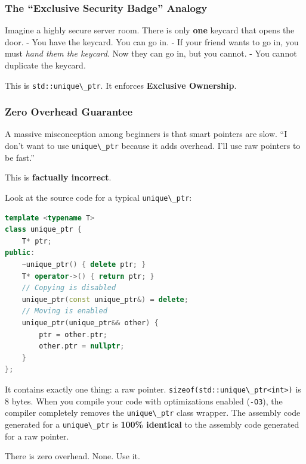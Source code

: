 \hypertarget{the-exclusive-security-badge-analogy}{%
\subsubsection{The ``Exclusive Security Badge''
Analogy}\label{the-exclusive-security-badge-analogy}}

Imagine a highly secure server room. There is only \textbf{one} keycard
that opens the door. - You have the keycard. You can go in. - If your
friend wants to go in, you must \emph{hand them the keycard}. Now they
can go in, but you cannot. - You cannot duplicate the keycard.

This is \passthrough{\lstinline!std::unique\_ptr!}. It enforces
\textbf{Exclusive Ownership}.

\hypertarget{zero-overhead-guarantee}{%
\subsubsection{Zero Overhead Guarantee}\label{zero-overhead-guarantee}}

A massive misconception among beginners is that smart pointers are slow.
``I don't want to use \passthrough{\lstinline!unique\_ptr!} because it
adds overhead. I'll use raw pointers to be fast.''

This is \textbf{factually incorrect}.

Look at the source code for a typical
\passthrough{\lstinline!unique\_ptr!}:

\begin{lstlisting}[language={C++}]
template <typename T>
class unique_ptr {
    T* ptr;
public:
    ~unique_ptr() { delete ptr; }
    T* operator->() { return ptr; }
    // Copying is disabled
    unique_ptr(const unique_ptr&) = delete; 
    // Moving is enabled
    unique_ptr(unique_ptr&& other) {
        ptr = other.ptr;
        other.ptr = nullptr;
    }
};
\end{lstlisting}

It contains exactly one thing: a raw pointer.
\passthrough{\lstinline!sizeof(std::unique\_ptr<int>)!} is 8 bytes. When
you compile your code with optimizations enabled
(\passthrough{\lstinline!-O3!}), the compiler completely removes the
\passthrough{\lstinline!unique\_ptr!} class wrapper. The assembly code
generated for a \passthrough{\lstinline!unique\_ptr!} is \textbf{100\%
identical} to the assembly code generated for a raw pointer.

There is zero overhead. None. Use it.

